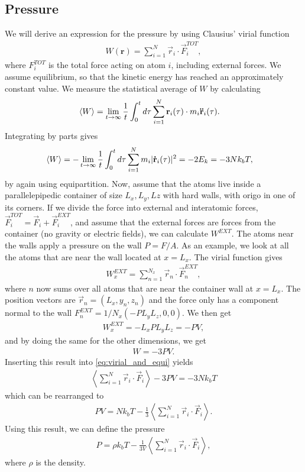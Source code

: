 \subsection{Pressure}
We will derive an expression for the pressure by using Clausius' virial function
\begin{align}
    W(\textbf{r}) = \sum_{i=1}^N \vec r_i \cdot \vec F_i^{TOT},
\end{align}
where $F_i^{TOT}$ is the total force acting on atom $i$, including external forces. We assume equilibrium, so that the kinetic energy has reached an approximately constant value. We measure the statistical average of $W$ by calculating
\begin{align}
    \langle W \rangle &= \lim_{t\rightarrow\infty} {1\over t} \int_0^t d\tau \sum_{i=1}^N \vec r_i(\tau) \cdot m_i \vec{\ddot r}_i(\tau).
\end{align}
Integrating by parts gives
\begin{align}
    \label{eq:virial_and_equi}
    \langle W \rangle &= -\lim_{t\rightarrow\infty} {1\over t} \int_0^t d\tau \sum_{i=1}^N m_i |\vec{\dot r}_i(\tau)|^2 = -2E_k = -3Nk_bT,
\end{align}
by again using equipartition. Now, assume that the atoms live inside a parallelepipedic container of size $L_x, L_y, Lz$ with hard walls, with origo in one of its corners. If we divide the force into external and interatomic forces, $\vec F_i^{TOT} = \vec F_i + \vec F_i^{EXT}$, and assume that the external forces are forces from the container (no gravity or electric fields), we can calculate $W^{EXT}$. The atoms near the walls apply a pressure on the wall $P = F/A$. As an example, we look at all the atoms that are near the wall located at $x=L_x$. The virial function gives
\begin{align}
    W^{EXT}_x = \sum_{n=1}^{N_x}\vec r_n\cdot \vec F_n^{EXT},
\end{align}
where $n$ now sums over all atoms that are near the container wall at $x=L_x$. The position vectors are $\vec r_n = (L_x, y_n, z_n)$ and the force only has a component normal to the wall $F_n^{EXT} = 1/N_x(-PL_yL_z, 0, 0)$. We then get
\begin{align}
    W^{EXT}_x = -L_xPL_yL_z = -PV,
\end{align}
and by doing the same for the other dimensions, we get
\begin{align}
    W = -3PV.
\end{align}
Inserting this result into \eqref{eq:virial_and_equi} yields
\begin{align}
    \left\langle \sum_{i=1}^N \vec r_i \cdot \vec F_i\right\rangle - 3PV = -3Nk_bT
\end{align}
which can be rearranged to
\begin{align}
    PV = Nk_bT - \frac{1}{3}\left\langle \sum_{i=1}^N \vec r_i \cdot \vec F_i\right\rangle.
\end{align}
Using this result, we can define the pressure
\begin{align}
    \label{eq:pressure_in_md}
	P = \rho k_bT - \frac{1}{3V}\left\langle \sum_{i=1}^N \vec r_i \cdot \vec F_i\right\rangle,
\end{align}
where $\rho$ is the density.

